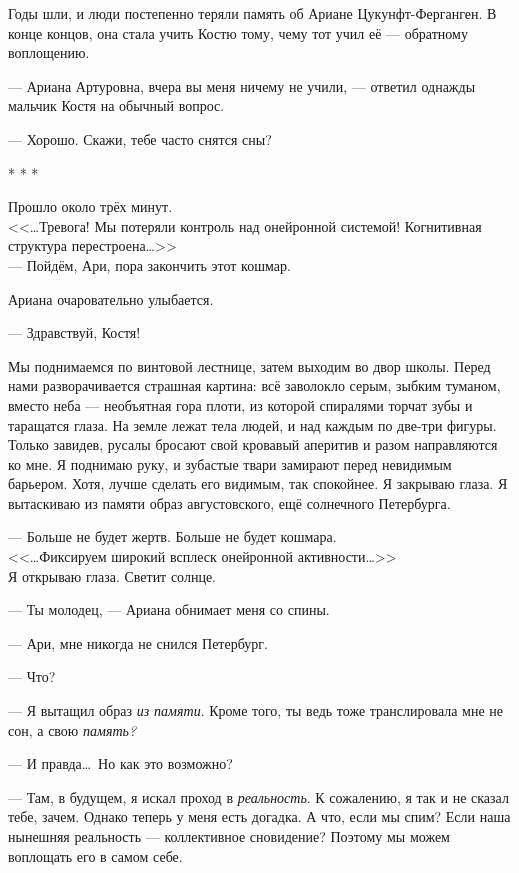 \documentclass[openany, oneside]{book}
\begin{document}
Годы шли, и люди постепенно теряли память об Ариане Цукунфт-Ферганген. В конце концов, она стала учить Костю тому, чему тот учил её --- обратному воплощению.

--- Ариана Артуровна, вчера вы меня ничему не учили, --- ответил однажды мальчик Костя на обычный вопрос.

--- Хорошо. Скажи, тебе часто снятся сны?

\begin{center}
    * * *
\end{center}

Прошло около трёх минут.\\

<<\dots Тревога! Мы потеряли контроль над онейронной системой! Когнитивная структура перестроена\dots>>\\

--- Пойдём, Ари, пора закончить этот кошмар.

Ариана очаровательно улыбается.

--- Здравствуй, Костя!

Мы поднимаемся по винтовой лестнице, затем выходим во двор школы. Перед нами разворачивается страшная картина: всё заволокло серым, зыбким туманом, вместо неба --- необъятная гора плоти, из которой спиралями торчат зубы и таращатся глаза. На земле лежат тела людей, и над каждым по две-три фигуры. Только завидев, русалы бросают свой кровавый аперитив и разом направляются ко мне. Я поднимаю руку, и зубастые твари замирают перед невидимым барьером. Хотя, лучше сделать его видимым, так спокойнее. Я закрываю глаза. Я вытаскиваю из памяти образ августовского, ещё солнечного Петербурга.

--- Больше не будет жертв. Больше не будет кошмара.\\

<<\dots Фиксируем широкий всплеск онейронной активности\dots>>\\

Я открываю глаза. Светит солнце.

--- Ты молодец, --- Ариана обнимает меня со спины.

--- Ари, мне никогда не снился Петербург.

--- Что?

--- Я вытащил образ \textit{из памяти}. Кроме того, ты ведь тоже транслировала мне не сон, а свою \textit{память?}

--- И правда\dots \ Но как это возможно?

--- Там, в будущем, я искал проход в \textit{реальность}. К сожалению, я так и не сказал тебе, зачем. Однако теперь у меня есть догадка. А что, если мы спим? Если наша нынешняя реальность --- коллективное сновидение? Поэтому мы можем воплощать его в самом себе.
\end{document}
